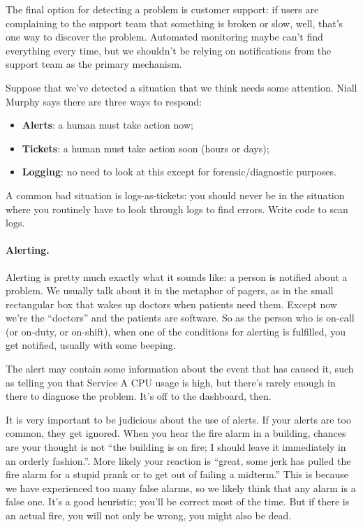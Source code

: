 The final option for detecting a problem is customer support: if users are complaining to the support team that something is broken or slow, well, that's one way to discover the problem. Automated monitoring maybe can't find everything every time, but we shouldn't be relying on notifications from the support team as the primary mechanism.

Suppose that we've detected a situation that we think needs some attention. Niall Murphy says there are three ways to respond:

\begin{itemize}
\item {\bf Alerts}: a human must take action now;
\item {\bf Tickets}: a human must take action soon (hours or days);
\item {\bf Logging}: no need to look at this except for forensic/diagnostic purposes.
\end{itemize}

A common bad situation is logs-as-tickets: you should never be in the
situation where you routinely have to look through logs to find
errors. Write code to scan logs.

\paragraph{Alerting.}
Alerting is pretty much exactly what it sounds like: a person is notified about a problem. We usually talk about it in the metaphor of pagers, as in the small rectangular box that wakes up doctors when patients need them. Except now we're the ``doctors'' and the patients are software. So as the person who is on-call (or on-duty, or on-shift), when one of the conditions for alerting is fulfilled, you get notified, usually with some beeping. 

The alert may contain some information about the event that has caused it, such as telling you that Service A CPU usage is high, but there's rarely enough in there to diagnose the problem. It's off to the dashboard, then.

It is very important to be judicious about the use of alerts. If your alerts are too common, they get ignored. When you hear the fire alarm in a building, chances are your thought is not ``the building is on fire; I should leave it immediately in an orderly fashion.''. More likely your reaction is ``great, some jerk has pulled the fire alarm for a stupid prank or to get out of failing a midterm.'' This is because we have experienced too many false alarms, so we likely think that any alarm is a false one. It's a good heuristic; you'll be correct most of the time. But if there is an actual fire, you will not only be wrong, you might also be dead.

